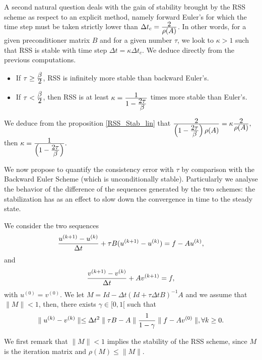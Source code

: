{A second natural question deals with the gain of stability brought by the RSS scheme as respect to an explicit method, namely forward Euler's for which the time step must be taken strictly lower than $\Delta t_c=\frac{\textstyle 2} {\textstyle \rho(A)}$.
In other words, for a given preconditioner matrix $B$ and for a given number $\tau$, we look to $\kappa>1$ such that
RSS is stable with time step $\Delta t =\kappa \Delta t_c$.
We deduce directly from the previous computations.
\begin{proposition_amiens}
\begin{itemize}
\item If $\tau\ge \frac{\textstyle \beta} {\textstyle 2}$, RSS is infinitely more stable than backward Euler's.
\item If $\tau < \frac{\textstyle \beta} {\textstyle 2}$, then RSS is at least $\kappa=\frac{\textstyle 1} {\textstyle 1-\frac{\textstyle 2\tau} {\textstyle \beta}}$ times more stable than Euler's.
\end{itemize} 
\end{proposition_amiens}
\begin{proof_amiens}
We deduce from the proposition \ref{RSS_Stab_lin} that 
$
\frac{\textstyle 2} {\textstyle \left(1-\frac{\textstyle 2\tau} {\textstyle \beta}\right)\rho(A)}=\kappa \frac{\textstyle 2} {\textstyle \rho(A)},
$
then
$
\kappa=\frac{\textstyle 1} {\textstyle \left(1-\frac{\textstyle 2\tau} {\textstyle \beta}\right)}.
$
\end{proof_amiens}


We now propose to quantify the consistency error with $\tau$ by comparison with the Backward Euler Scheme (which is unconditionally stable). Particularly we analyse the behavior of the difference of the sequences generated by the two schemes: the stabilization has as an effect to slow down the convergence in time to the steady state.


\begin{proposition_amiens}
We consider the two sequences
$$
 \frac{\textstyle u^{(k+1)}-u^{(k)}} {\textstyle \Delta t} +\tau B (u^{(k+1)}-u^{(k)}) =f-Au^{(k)},
 $$
and
$$
 \frac{\textstyle v^{(k+1)}-v^{(k)}} {\textstyle \Delta t} +A v^{(k+1)} =f,
 $$
 with $u^{(0)}=v^{(0)}$. We let $M=Id-\Delta t(Id+\tau \Delta t B)^{-1}A$ and we assume that $\parallel M\parallel < 1$,
 then,  there exists $\gamma \in [0,1[$ such that
 $$
\parallel u^{(k)}- v^{(k)}\parallel \le  \Delta t^2 \parallel  \tau B-A\parallel \frac{\textstyle 1} {\textstyle 1-\gamma}\parallel  f-Av^{(0)} \parallel  , \forall k \ge 0.
$$
\end{proposition_amiens}
\begin{proof_amiens}
We first remark that $\parallel M\parallel < 1$ implies the stability of the RSS scheme, since $M$ is the iteration matrix and $\rho(M)\le \parallel M\parallel $.


\end{proof_amiens}}
